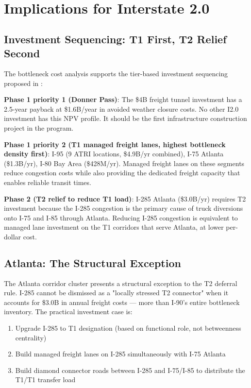\section{Implications for Interstate 2.0}

\subsection{Investment Sequencing: T1 First, T2 Relief Second}

The bottleneck cost analysis supports the tier-based investment sequencing proposed in \citet{ROUTE_E2}:

\textbf{Phase 1 priority 1 (Donner Pass)}: The \$4B freight tunnel investment has a 2.5-year payback at \$1.6B/year in avoided weather closure costs. No other I2.0 investment has this NPV profile. It should be the first infrastructure construction project in the program.

\textbf{Phase 1 priority 2 (T1 managed freight lanes, highest bottleneck density first)}: I-95 (9 ATRI locations, \$4.9B/yr combined), I-75 Atlanta (\$1.3B/yr), I-80 Bay Area (\$428M/yr). Managed freight lanes on these segments reduce congestion costs while also providing the dedicated freight capacity that enables reliable transit times.

\textbf{Phase 2 (T2 relief to reduce T1 load)}: I-285 Atlanta (\$3.0B/yr) requires T2 investment because the I-285 congestion is the primary cause of truck diversions onto I-75 and I-85 through Atlanta. Reducing I-285 congestion is equivalent to managed lane investment on the T1 corridors that serve Atlanta, at lower per-dollar cost.

\subsection{Atlanta: The Structural Exception}

The Atlanta corridor cluster presents a structural exception to the T2 deferral rule. I-285 cannot be dismissed as a "locally stressed T2 connector" when it accounts for \$3.0B in annual freight costs --- more than I-90's entire bottleneck inventory. The practical investment case is:

\begin{enumerate}
\item Upgrade I-285 to T1 designation (based on functional role, not betweenness centrality)
\item Build managed freight lanes on I-285 simultaneously with I-75 Atlanta
\item Build diamond connector roads between I-285 and I-75/I-85 to distribute the T1/T1 transfer load
\end{enumerate}

